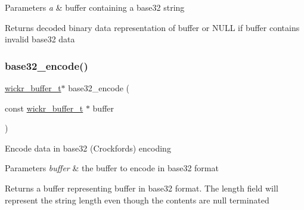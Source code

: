 \begin{DoxyParams}{Parameters}
{\em a} & buffer containing a base32 string \\
\hline
\end{DoxyParams}
\begin{DoxyReturn}{Returns}
decoded binary data representation of \textquotesingle{}buffer\textquotesingle{} or N\+U\+LL if \textquotesingle{}buffer\textquotesingle{} contains invalid base32 data 
\end{DoxyReturn}
\mbox{\label{group__base32_ga343c12edab05fb3b98a18474e20487c6}} 
\subsubsection{\texorpdfstring{base32\+\_\+encode()}{base32\_encode()}}
{\footnotesize\ttfamily \mbox{\hyperlink{structwickr__buffer}{wickr\+\_\+buffer\+\_\+t}}$\ast$ base32\+\_\+encode (\begin{DoxyParamCaption}\item[{const \mbox{\hyperlink{structwickr__buffer}{wickr\+\_\+buffer\+\_\+t}} $\ast$}]{buffer }\end{DoxyParamCaption})}

Encode data in base32 (Crockford\textquotesingle{}s) encoding


\begin{DoxyParams}{Parameters}
{\em buffer} & the buffer to encode in base32 format \\
\hline
\end{DoxyParams}
\begin{DoxyReturn}{Returns}
a buffer representing \textquotesingle{}buffer\textquotesingle{} in base32 format. The length field will represent the string length even though the contents are null terminated 
\end{DoxyReturn}
